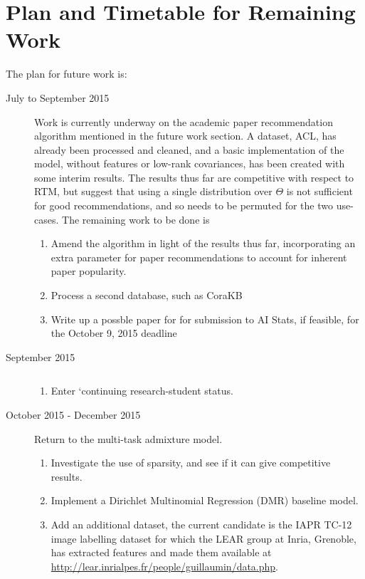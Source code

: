 

\chapter{Plan and Timetable for Remaining Work}

The plan for future work is:
\begin{description}
\item[July to September 2015] $\text{ } $\\
Work is currently underway on the academic paper recommendation algorithm mentioned in the future work section. A dataset, ACL, has already been processed and cleaned, and a basic implementation of the model, without features or low-rank covariances, has been created with some interim results. The results thus far are competitive with respect to RTM, but suggest that using a single distribution over $\Theta$ is not sufficient for good recommendations, and so needs to be permuted for the two use-cases. The remaining work to be done is
\begin{enumerate}
    \item Amend the algorithm in light of the results thus far, incorporating an extra parameter for paper recommendations to account for inherent paper popularity.
    \item Process a second database, such as CoraKB
    \item Write up a possble paper for for submission to AI Stats, if feasible, for the October 9, 2015 deadline
\end{enumerate}
\item[September 2015] $\text{ } $\\
\begin{enumerate}
    \item Enter `continuing research-student status.
\end{enumerate}
\item[October 2015 - December 2015] $\text{ } $\\
Return to the multi-task admixture model. 
\begin{enumerate}
    \item Investigate the use of sparsity, and see if it can give competitive results. 
    \item Implement a Dirichlet Multinomial Regression (DMR) baseline model. 
    \item Add an additional dataset, the current candidate is the IAPR TC-12 image labelling dataset for which the LEAR group at Inria, Grenoble, has extracted features and made them available at \url{http://lear.inrialpes.fr/people/guillaumin/data.php}.

\end{enumerate}
\end{description}
